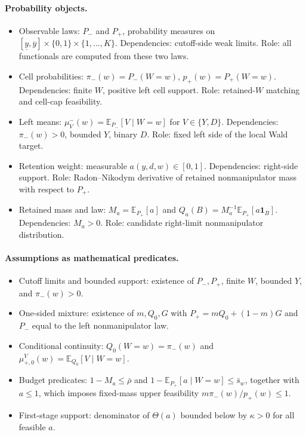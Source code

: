 \documentclass[11pt]{article}
\newcommand{\E}{\mathbb{E}}
\newcommand{\one}{\mathbf{1}}
\theoremstyle{definition}
\theoremstyle{plain}
\theoremstyle{remark}
\begin{document}
\paragraph{Probability objects.}
\begin{itemize}[leftmargin=*]
  \item Observable laws: \(P_-\) and \(P_+\), probability measures on
  \([\underline y,\overline y]\times\{0,1\}\times\{1,\ldots,K\}\).
  Dependencies: cutoff-side weak limits.  Role: all functionals are computed from these
  two laws.
  \item Cell probabilities: \(\pi_-(w)=P_-(W=w)\), \(p_+(w)=P_+(W=w)\).
  Dependencies: finite \(W\), positive left cell support.  Role: retained-\(W\) matching
  and cell-cap feasibility.
  \item Left means: \(\mu^-_V(w)=\E_{P_-}[V\mid W=w]\) for \(V\in\{Y,D\}\).
  Dependencies: \(\pi_-(w)>0\), bounded \(Y\), binary \(D\).  Role: fixed left side of the
  local Wald target.
  \item Retention weight: measurable \(a(y,d,w)\in[0,1]\).  Dependencies: right-side
  support.  Role: Radon--Nikodym derivative of retained nonmanipulator mass with respect
  to \(P_+\).
  \item Retained mass and law: \(M_a=\E_{P_+}[a]\) and
  \(Q_a(B)=M_a^{-1}\E_{P_+}[a\one_B]\).  Dependencies: \(M_a>0\).  Role: candidate
  right-limit nonmanipulator distribution.
\end{itemize}

\paragraph{Assumptions as mathematical predicates.}
\begin{itemize}[leftmargin=*]
  \item Cutoff limits and bounded support: existence of \(P_-,P_+\), finite \(W\), bounded
  \(Y\), and \(\pi_-(w)>0\).
  \item One-sided mixture: existence of \(m,Q_0,G\) with \(P_+=mQ_0+(1-m)G\) and \(P_-\)
  equal to the left nonmanipulator law.
  \item Conditional continuity: \(Q_0(W=w)=\pi_-(w)\) and
  \(\mu^V_{+,0}(w)=\E_{Q_0}[V\mid W=w]\).
  \item Budget predicates: \(1-M_a\le\bar\rho\) and
  \(1-\E_{P_+}[a\mid W=w]\le\bar s_w\), together with \(a\le1\), which imposes
  fixed-mass upper feasibility \(m\pi_-(w)/p_+(w)\le1\).
  \item First-stage support: denominator of \(\Theta(a)\) bounded below by \(\kappa>0\)
  for all feasible \(a\).
\end{itemize}
\end{document}
